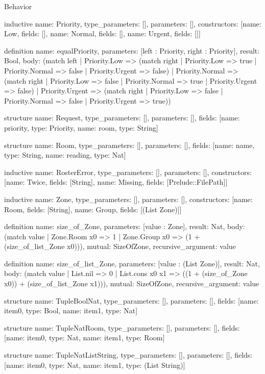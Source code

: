 \begin{lexlean}{Behavior}
\begin{semanticmodule}
inductive{
  name: Priority,
  type_parameters: [],
  parameters: [],
  constructors: [{name: Low, fields: []}, {name: Normal, fields: []}, {name: Urgent, fields: []}]
}

definition{
  name: equalPriority,
  parameters: [left : Priority, right : Priority],
  result: Bool,
  body: (match left
    | Priority.Low => (match right
      | Priority.Low => true
      | Priority.Normal => false
      | Priority.Urgent => false)
    | Priority.Normal => (match right
      | Priority.Low => false
      | Priority.Normal => true
      | Priority.Urgent => false)
    | Priority.Urgent => (match right
      | Priority.Low => false
      | Priority.Normal => false
      | Priority.Urgent => true))
}

structure{
  name: Request,
  type_parameters: [],
  parameters: [],
  fields: [{name: priority, type: Priority}, {name: room, type: String}]
}

structure{
  name: Room,
  type_parameters: [],
  parameters: [],
  fields: [{name: name, type: String}, {name: reading, type: Nat}]
}

inductive{
  name: RosterError,
  type_parameters: [],
  parameters: [],
  constructors: [{name: Twice, fields: [String]}, {name: Missing, fields: [Prelude::FilePath]}]
}

inductive{
  name: Zone,
  type_parameters: [],
  parameters: [],
  constructors: [{name: Room, fields: [String]}, {name: Group, fields: [(List Zone)]}]
}

definition{
  name: size_of_Zone,
  parameters: [value : Zone],
  result: Nat,
  body: (match value | Zone.Room x0 => 1 | Zone.Group x0 => (1 + (size_of_list_Zone x0))),
  mutual: SizeOfZone,
  recursive_argument: value
}

definition{
  name: size_of_list_Zone,
  parameters: [value : (List Zone)],
  result: Nat,
  body: (match value
    | List.nil => 0
    | List.cons x0 x1 => ((1 + (size_of_Zone x0)) + (size_of_list_Zone x1))),
  mutual: SizeOfZone,
  recursive_argument: value
}

structure{
  name: TupleBoolNat,
  type_parameters: [],
  parameters: [],
  fields: [{name: item0, type: Bool}, {name: item1, type: Nat}]
}

structure{
  name: TupleNatRoom,
  type_parameters: [],
  parameters: [],
  fields: [{name: item0, type: Nat}, {name: item1, type: Room}]
}

structure{
  name: TupleNatListString,
  type_parameters: [],
  parameters: [],
  fields: [{name: item0, type: Nat}, {name: item1, type: (List String)}]
}


\end{semanticmodule}
\end{lexlean}
